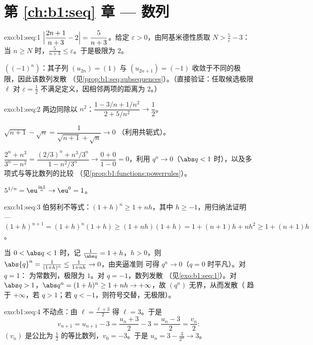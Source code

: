 \section*{第 \ref{ch:b1:seq} 章 --- 数列}

\begin{solution}{exo:b1:seq:1}
$\Bigl|\dfrac{2n+1}{n+3} - 2\Bigr| = \dfrac{5}{n+3}$。给定
$\varepsilon > 0$，由阿基米德性质取 $N > \frac 5\varepsilon - 3$：
当 $n \geq N$ 时，$\frac{5}{n+3} \leq \varepsilon$。于是极限为
$2$。

$((-1)^n)$：其子列 $(u_{2n}) = (1)$ 与 $(u_{2n+1}) =
(-1)$ 收敛于不同的极限，因此该数列发散
（见\cref{prop:b1:seq:subsequences}）。（直接验证：任取候选极限 $\ell$
对 $\varepsilon = \frac12$ 不满足定义，因相邻两项的距离为
$2$。）
\end{solution}

\begin{solution}{exo:b1:seq:2}
两边同除以 $n^2$：$\dfrac{1 - 3/n + 1/n^2}{2 + 5/n^2} \to
\dfrac12$。

$\sqrt{n+1} - \sqrt n = \dfrac{1}{\sqrt{n+1} + \sqrt n} \to 0$
（利用共轭式）。

$\dfrac{2^n + n^3}{3^n - n^2} = \dfrac{(2/3)^n + n^3/3^n}{1 -
n^2/3^n} \to \dfrac{0 + 0}{1 - 0} = 0$，利用 $q^n \to 0$（$\abs q
< 1$ 时），以及多项式与等比数列的比较
（见\cref{prop:b1:functions:powerrules}）。

$5^{1/n} = \eu^{\frac{\ln 5}{n}} \to \eu^0 = 1$。
\end{solution}

\begin{solution}{exo:b1:seq:3}
伯努利不等式：$(1+h)^n \geq 1 + nh$，其中 $h \geq -1$，用归纳法证明 ---
$(1+h)^{n+1} = (1+h)^n(1+h) \geq (1+nh)(1+h) = 1 + (n+1)h + nh^2
\geq 1 + (n+1)h$。

当 $0 < \abs q < 1$ 时，记 $\frac{1}{\abs q} = 1 + h$，$h > 0$，则
$\abs{q}^n = \frac{1}{(1+h)^n} \leq \frac{1}{1 + nh} \to 0$，由夹逼准则
可得 $q^n \to 0$（$q = 0$ 时平凡）。对 $q = 1$：
为常数列，极限为 $1$。对 $q = -1$，数列发散
（见\cref{exo:b1:seq:1}）。对 $\abs q > 1$，$\abs q^n = (1 + h)^n \geq
1 + nh \to +\infty$，故 $(q^n)$ 无界，从而发散（
趋于 $+\infty$，若 $q > 1$；若 $q <
-1$，则符号交替，无极限）。
\end{solution}

\begin{solution}{exo:b1:seq:4}
不动点：由 $\ell = \frac{\ell + 3}{2}$ 得 $\ell = 3$。于是
\[
v_{n+1} = u_{n+1} - 3 = \frac{u_n + 3}{2} - 3 = \frac{u_n - 3}{2} =
\frac{v_n}{2}:
\]
$(v_n)$ 是公比为 $\frac12$ 的等比数列，$v_0 = -3$。于是 $u_n = 3 -
\frac{3}{2^n} \to 3$。
\end{solution}

